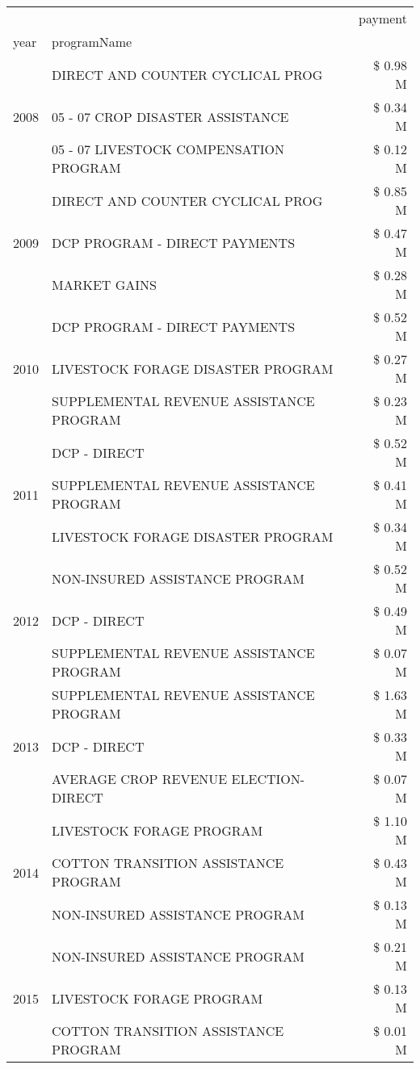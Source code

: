 \begin{tabular}{llr}
\toprule
 &  & payment \\
year & programName &  \\
\midrule
\multirow[t]{3}{*}{2008} & DIRECT AND COUNTER CYCLICAL PROG & \$ 0.98 M \\
 & 05 - 07 CROP DISASTER ASSISTANCE & \$ 0.34 M \\
 & 05 - 07 LIVESTOCK COMPENSATION PROGRAM & \$ 0.12 M \\
\cline{1-3}
\multirow[t]{3}{*}{2009} & DIRECT AND COUNTER CYCLICAL PROG & \$ 0.85 M \\
 & DCP PROGRAM - DIRECT PAYMENTS & \$ 0.47 M \\
 & MARKET GAINS & \$ 0.28 M \\
\cline{1-3}
\multirow[t]{3}{*}{2010} & DCP PROGRAM - DIRECT PAYMENTS & \$ 0.52 M \\
 & LIVESTOCK FORAGE DISASTER  PROGRAM & \$ 0.27 M \\
 & SUPPLEMENTAL REVENUE ASSISTANCE PROGRAM & \$ 0.23 M \\
\cline{1-3}
\multirow[t]{3}{*}{2011} & DCP - DIRECT & \$ 0.52 M \\
 & SUPPLEMENTAL REVENUE ASSISTANCE PROGRAM & \$ 0.41 M \\
 & LIVESTOCK FORAGE DISASTER PROGRAM & \$ 0.34 M \\
\cline{1-3}
\multirow[t]{3}{*}{2012} & NON-INSURED ASSISTANCE PROGRAM & \$ 0.52 M \\
 & DCP - DIRECT & \$ 0.49 M \\
 & SUPPLEMENTAL REVENUE ASSISTANCE PROGRAM & \$ 0.07 M \\
\cline{1-3}
\multirow[t]{3}{*}{2013} & SUPPLEMENTAL REVENUE ASSISTANCE PROGRAM & \$ 1.63 M \\
 & DCP - DIRECT & \$ 0.33 M \\
 & AVERAGE CROP REVENUE ELECTION-DIRECT & \$ 0.07 M \\
\cline{1-3}
\multirow[t]{3}{*}{2014} & LIVESTOCK FORAGE PROGRAM & \$ 1.10 M \\
 & COTTON TRANSITION ASSISTANCE PROGRAM & \$ 0.43 M \\
 & NON-INSURED ASSISTANCE PROGRAM & \$ 0.13 M \\
\cline{1-3}
\multirow[t]{3}{*}{2015} & NON-INSURED ASSISTANCE PROGRAM & \$ 0.21 M \\
 & LIVESTOCK FORAGE PROGRAM & \$ 0.13 M \\
 & COTTON TRANSITION ASSISTANCE PROGRAM & \$ 0.01 M \\

\end{tabular}
